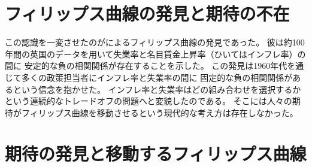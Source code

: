 \section{フィリップス曲線の発見と期待の不在}
\label{sec:review_discovery_of_phillips_curve}



この認識を一変させたのが\textcite{Phillips1958}によるフィリップス曲線の発見であった。
彼は約100年間の英国のデータを用いて失業率と名目賃金上昇率（ひいてはインフレ率）の間に
安定的な負の相関関係が存在することを示した。
この発見は1960年代を通じて多くの政策担当者にインフレ率と失業率の間に
固定的な負の相関関係があるという信念を抱かせた。
インフレ率と失業率はどの組み合わせを選択するかという連続的なトレードオフの問題へと変貌したのである。
そこには人々の期待がフィリップス曲線を移動させるという現代的な考え方は存在しなかった。

\section{期待の発見と移動するフィリップス曲線}
\label{sec:review_shifting_phillips_curve}



